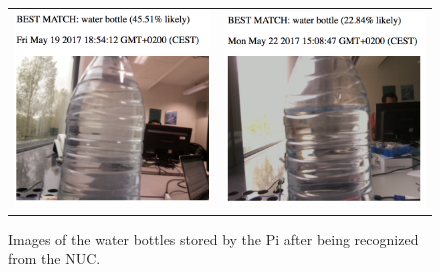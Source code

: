 \begin{figure}[H]
\begin{tabular}{cc}
		\\
		\includegraphics[scale=0.5]{images/water-bottle-3.png}
		&
		\includegraphics[scale=0.5]{images/water-bottle-4.png}
	\end{tabular}
	\caption{Images of the water bottles stored by the Pi after being recognized from the NUC.}
	\label{fig:water-bottles}
\end{figure}




